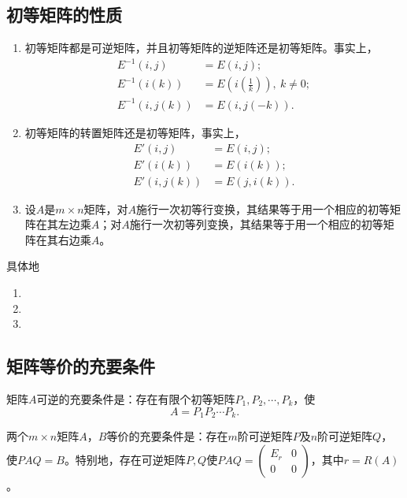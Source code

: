 \subsection{初等矩阵的性质}
\begin{enumerate}
    \item 初等矩阵都是可逆矩阵，并且初等矩阵的逆矩阵还是初等矩阵。事实上，
\[
\begin{align*}
E^{-1}(i,j)&=E(i,j);\\
E^{-1}(i(k))&=E(i(\tfrac{1}{k})),\ k\neq0;\\
E^{-1}(i,j(k))&=E(i,j(-k)).
\end{align*}
\]

    \item 初等矩阵的转置矩阵还是初等矩阵，事实上，
\[
\begin{align*}
E'(i,j)&=E(i,j);\\
E'(i(k))&=E(i(k));\\
E'(i,j(k))&=E(j,i(k)).
\end{align*}
\]

    \item 设$A$是$m\times n$矩阵，对$A$施行一次初等行变换，其结果等于用一个相应的初等矩阵在其左边乘$A$；对$A$施行一次初等列变换，其结果等于用一个相应的初等矩阵在其右边乘$A$。
\end{enumerate}

具体地
\begin{enumerate}
    \item %
    \item %
    \item %
\end{enumerate}

\subsection{矩阵等价的充要条件}
\begin{theorem}
矩阵$A$可逆的充要条件是：存在有限个初等矩阵$P_1,P_2,\cdots,P_k$，使
\[
A=P_1P_2\cdots P_k.
\]
\end{theorem}

\begin{corollary}
两个$m\times n$矩阵$A$，$B$等价的充要条件是：存在$m$阶可逆矩阵$P$及$n$阶可逆矩阵$Q$，使$PAQ=B$。特别地，存在可逆矩阵$P,Q$使$PAQ=\begin{pmatrix}E_r&0\\0&0\end{pmatrix}$，其中$r=R(A)$。
\end{corollary}

